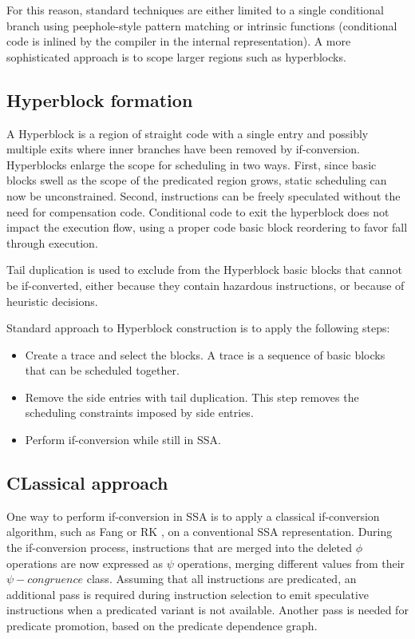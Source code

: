 For this reason, standard techniques are either limited to a single conditional branch using peephole-style pattern matching or intrinsic functions (conditional code is inlined by the compiler in the internal representation). A more sophisticated approach is to scope larger regions such as hyperblocks. 

\subsection{Hyperblock formation}

A Hyperblock is a region of straight code with a single entry and possibly multiple exits where inner branches have been removed by if-conversion.
Hyperblocks enlarge the scope for scheduling in two ways. First, since basic blocks swell as the scope of the predicated region grows, static scheduling can now be unconstrained. Second, instructions can be freely speculated without the need for compensation code. Conditional code to exit the hyperblock does not impact the execution flow, using a proper code basic block reordering to favor fall through execution.

Tail duplication is used to exclude from the Hyperblock basic blocks that cannot be if-converted, either because they contain hazardous instructions, or because of heuristic decisions. 

Standard approach to Hyperblock construction is to apply the following steps:

\begin{itemize}
\item Create a trace and select the blocks. A trace is a sequence of basic blocks that can be scheduled together. 
\item Remove the side entries with tail duplication. This step removes the scheduling constraints imposed by side entries.
\item Perform if-conversion while still in SSA.
\end{itemize}

\subsection{CLassical approach}

One way to perform if-conversion in SSA is to apply a classical if-conversion algorithm, such as Fang \cite{Fang:1996:CAI:645674.663446} or RK \cite{Schlansker-predicated}, on a conventional SSA representation. 
During the if-conversion process, instructions that are merged into the deleted $\phi$ operations are now expressed as $\psi$ operations, merging different values from their $\psi-congruence$ class. Assuming that all instructions are predicated, an additional pass is required during instruction selection to emit speculative instructions when a predicated variant is not available. Another pass is needed for predicate promotion, based on the predicate dependence graph.

